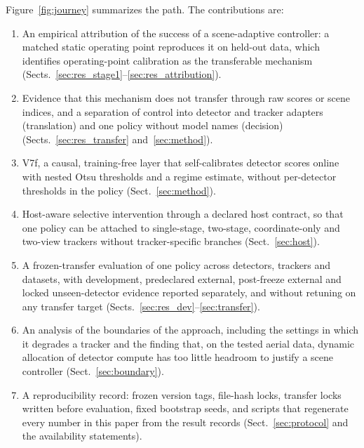 \documentclass[pdflatex,sn-mathphys-num]{sn-jnl}
\begin{document}
Figure~\ref{fig:journey} summarizes the path. The contributions are:
\begin{enumerate}
\item An empirical attribution of the success of a scene-adaptive controller: a matched static operating point reproduces it on held-out data, which identifies operating-point calibration as the transferable mechanism (Sects.~\ref{sec:res_stage1}--\ref{sec:res_attribution}).
\item Evidence that this mechanism does not transfer through raw scores or scene indices, and a separation of control into detector and tracker adapters (translation) and one policy without model names (decision) (Sects.~\ref{sec:res_transfer} and~\ref{sec:method}).
\item V7f, a causal, training-free layer that self-calibrates detector scores online with nested Otsu thresholds and a regime estimate, without per-detector thresholds in the policy (Sect.~\ref{sec:method}).
\item Host-aware selective intervention through a declared host contract, so that one policy can be attached to single-stage, two-stage, coordinate-only and two-view trackers without tracker-specific branches (Sect.~\ref{sec:host}).
\item A frozen-transfer evaluation of one policy across detectors, trackers and datasets, with development, predeclared external, post-freeze external and locked unseen-detector evidence reported separately, and without retuning on any transfer target (Sects.~\ref{sec:res_dev}--\ref{sec:transfer}).
\item An analysis of the boundaries of the approach, including the settings in which it degrades a tracker and the finding that, on the tested aerial data, dynamic allocation of detector compute has too little headroom to justify a scene controller (Sect.~\ref{sec:boundary}).
\item A reproducibility record: frozen version tags, file-hash locks, transfer locks written before evaluation, fixed bootstrap seeds, and scripts that regenerate every number in this paper from the result records (Sect.~\ref{sec:protocol} and the availability statements).
\end{enumerate}
\end{document}
